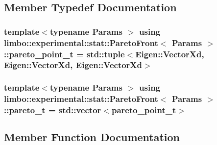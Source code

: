 \subsection{Member Typedef Documentation}
\hypertarget{structlimbo_1_1experimental_1_1stat_1_1_pareto_front_a2d872d2ad0a93b4c459bad640be158b9}{}
\subsubsection[{pareto\+\_\+point\+\_\+t}]{\setlength{\rightskip}{0pt plus 5cm}template$<$typename Params $>$ using {\bf limbo\+::experimental\+::stat\+::\+Pareto\+Front}$<$ Params $>$\+::{\bf pareto\+\_\+point\+\_\+t} =  std\+::tuple$<$Eigen\+::\+Vector\+Xd, Eigen\+::\+Vector\+Xd, Eigen\+::\+Vector\+Xd$>$}\label{structlimbo_1_1experimental_1_1stat_1_1_pareto_front_a2d872d2ad0a93b4c459bad640be158b9}
\hypertarget{structlimbo_1_1experimental_1_1stat_1_1_pareto_front_a710260d53bff65b4841c348b074a6e23}{}
\subsubsection[{pareto\+\_\+t}]{\setlength{\rightskip}{0pt plus 5cm}template$<$typename Params $>$ using {\bf limbo\+::experimental\+::stat\+::\+Pareto\+Front}$<$ Params $>$\+::{\bf pareto\+\_\+t} =  std\+::vector$<${\bf pareto\+\_\+point\+\_\+t}$>$}\label{structlimbo_1_1experimental_1_1stat_1_1_pareto_front_a710260d53bff65b4841c348b074a6e23}


\subsection{Member Function Documentation}
\hypertarget{structlimbo_1_1experimental_1_1stat_1_1_pareto_front_a341b34d96290a874818bbdb4f27f9f2b}{}
